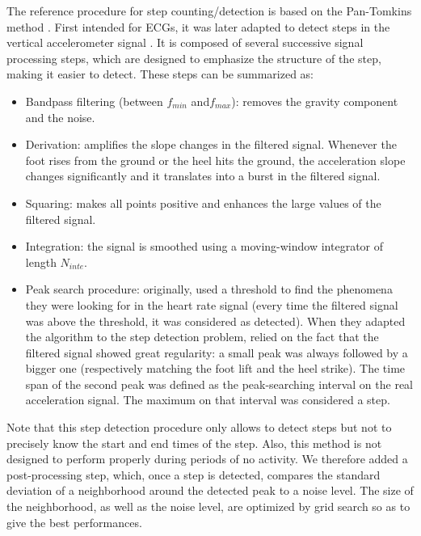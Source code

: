 \documentclass[../thesis.tex]{subfiles}
\begin{document}
The reference procedure for step counting/detection is based on the Pan-Tomkins method \citep{pan1985real}. First intended for ECGs, it was  later adapted to detect steps in the vertical accelerometer signal \citep{ying2007automatic,libby2012simple,marschollek2008performance,thuer2008step}. It is composed of several successive signal processing steps, which are designed to emphasize the structure of the step, making it easier to detect. These steps can be summarized as:

\begin{itemize}
 \item Bandpass filtering (between $f_{min}$ and$ f_{max}$): removes the gravity component and the noise.
  \item Derivation: amplifies the slope changes in the filtered signal. Whenever the foot rises from the ground or the heel hits the ground, the acceleration slope changes significantly and it translates into a burst in the filtered signal.
  \item Squaring: makes all points positive and enhances the large values of the filtered signal.
  \item Integration: the signal is smoothed using a moving-window integrator of length $N_{inte}$.
  \item Peak search procedure: originally, \citet{pan1985real} used a threshold to find the phenomena they were looking for in the heart rate signal (every time the filtered signal was above the threshold, it was considered as detected). When they adapted the algorithm to the step detection problem, \citet{ying2007automatic} relied on the fact that the filtered signal showed great regularity: a small peak was always followed by a bigger one (respectively matching the foot lift and the heel strike). The time span of the second peak was defined as the peak-searching interval on the real acceleration signal. The maximum on that interval was considered a step.
\end{itemize}

Note that this step detection procedure only allows to detect steps but not to precisely know the start and end times of the step. Also, this method is not designed to perform properly during periods of no activity. We therefore added a post-processing step, which, once a step is detected, compares the standard deviation of a neighborhood around the detected peak to a noise level. The size of the neighborhood, as well as the noise level, are optimized by grid search so as to give the best performances.
\end{document}
